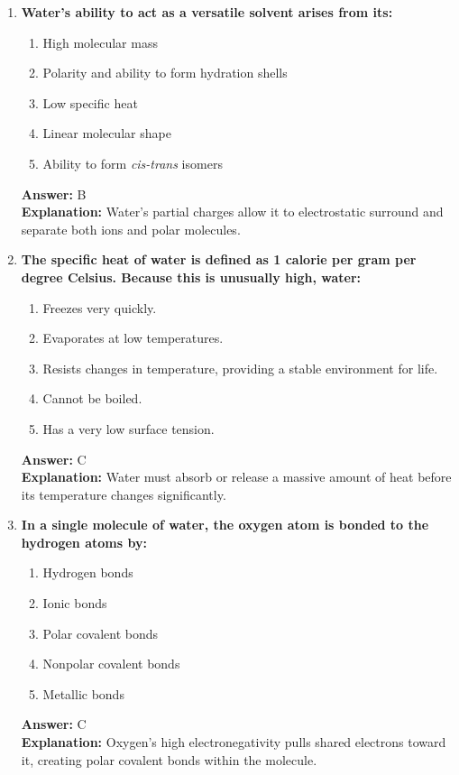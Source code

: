\documentclass[11pt, a4paper]{article}
\begin{document}
\begin{enumerate}
\item \textbf{Water's ability to act as a versatile solvent arises from its:}
\begin{enumerate}[label=\Alph*.]
    \item High molecular mass
    \item Polarity and ability to form hydration shells
    \item Low specific heat
    \item Linear molecular shape
    \item Ability to form \textit{cis-trans} isomers
\end{enumerate}
\textbf{Answer:} B \\
\textbf{Explanation:} Water's partial charges allow it to electrostatic surround and separate both ions and polar molecules.

\item \textbf{The specific heat of water is defined as 1 calorie per gram per degree Celsius. Because this is unusually high, water:}
\begin{enumerate}[label=\Alph*.]
    \item Freezes very quickly.
    \item Evaporates at low temperatures.
    \item Resists changes in temperature, providing a stable environment for life.
    \item Cannot be boiled.
    \item Has a very low surface tension.
\end{enumerate}
\textbf{Answer:} C \\
\textbf{Explanation:} Water must absorb or release a massive amount of heat before its temperature changes significantly.

\item \textbf{In a single molecule of water, the oxygen atom is bonded to the hydrogen atoms by:}
\begin{enumerate}[label=\Alph*.]
    \item Hydrogen bonds
    \item Ionic bonds
    \item Polar covalent bonds
    \item Nonpolar covalent bonds
    \item Metallic bonds
\end{enumerate}
\textbf{Answer:} C \\
\textbf{Explanation:} Oxygen's high electronegativity pulls shared electrons toward it, creating polar covalent bonds within the molecule.


\end{enumerate}
\end{document}
